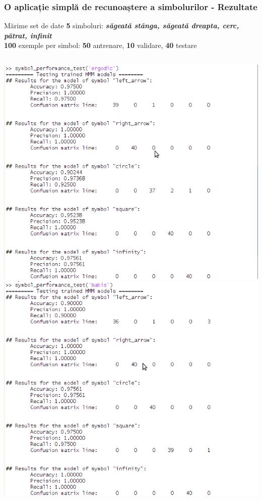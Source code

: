 \begin{frame}[t]
	\frametitle{O aplicație simplă de recunoaștere a simbolurilor - Rezultate}
	\scriptsize
	\begin{block}{Mărime set de date}
		\textbf{5} simboluri: \textbf{\emph{săgeată stânga, săgeată dreapta, cerc, pătrat, infinit}}\\
		\textbf{100} exemple per simbol: \textbf{50} antrenare, \textbf{10} validare, \textbf{40} testare
	\end{block}
	\normalsize
	
	\begin{columns}[T]
		\includegraphics[width=\textwidth]{graphics/demo-app/results-ergodic.png}
		\includegraphics[width=\textwidth]{graphics/demo-app/results-bakis.png}
	\end{columns}
\end{frame}